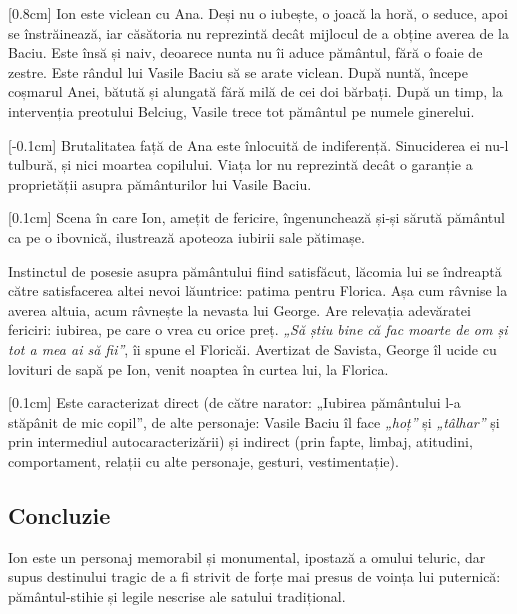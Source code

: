 \documentclass[
12pt,
a4paper
]{article}
\begin{document}
[0.8cm]
Ion este viclean cu Ana. Deși nu o iubește, o joacă la horă, o seduce, apoi se înstrăinează, iar căsătoria nu reprezintă decât mijlocul de a obține averea de la Baciu. Este însă și naiv, deoarece nunta nu îi aduce pământul, fără o foaie de zestre. Este rândul lui Vasile Baciu să se arate viclean. După nuntă, începe coșmarul Anei, bătută și alungată fără milă de cei doi bărbați. După un timp, la intervenția preotului Belciug, Vasile trece tot pământul pe numele ginerelui.

[-0.1cm]
Brutalitatea față de Ana este înlocuită de indiferență. Sinuciderea ei nu-l tulbură, și nici moartea copilului. Viața lor nu reprezintă decât o garanție a proprietății asupra pământurilor lui Vasile Baciu.

[0.1cm]
Scena în care Ion, amețit de fericire, îngenunchează și-și sărută pământul ca pe o ibovnică, ilustrează apoteoza iubirii sale pătimașe.

Instinctul de posesie asupra pământului fiind satisfăcut, lăcomia lui se îndreaptă către satisfacerea altei nevoi lăuntrice: patima pentru Florica. Așa cum râvnise la averea altuia, acum râvnește la nevasta lui George. Are relevația adevăratei fericiri: iubirea, pe care o vrea cu orice preț. \textit{„Să știu bine că fac moarte de om și tot a mea ai să fii”}, îi spune el Floricăi. Avertizat de Savista, George îl ucide cu lovituri de sapă pe Ion, venit noaptea în curtea lui, la Florica.

[0.1cm]
Este caracterizat direct (de către narator: „Iubirea pământului l-a stăpânit de mic copil”, de alte personaje: Vasile Baciu îl face \textit{„hoț”} și \textit{„tâlhar”} și prin intermediul autocaracterizării) și indirect (prin fapte, limbaj, atitudini, comportament, relații cu alte personaje, gesturi, vestimentație).

\subsection{Concluzie}

Ion este un personaj memorabil și monumental, ipostază a omului teluric, dar supus destinului tragic de a fi strivit de forțe mai presus de voința lui puternică: pământul-stihie și legile nescrise ale satului tradițional.
\end{document}
